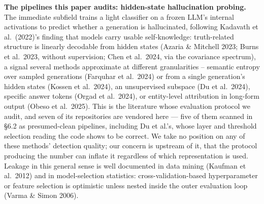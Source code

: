 \documentclass[10pt]{article} %
\begin{document}
\textbf{The pipelines this paper audits: hidden-state hallucination probing.}
The immediate subfield trains a light classifier on a frozen LLM's internal
activations to predict whether a generation is hallucinated, following
Kadavath et al.\ (2022)'s finding that models carry usable self-knowledge:
truth-related structure is linearly decodable from hidden states (Azaria \&
Mitchell 2023; Burns et al.\ 2023, without supervision; Chen et al.\ 2024,
via the covariance spectrum), a signal several methods approximate at
different granularities -- semantic entropy over sampled generations
(Farquhar et al.\ 2024) or from a single generation's hidden states (Kossen
et al.\ 2024), an unsupervised subspace (Du et al.\ 2024), specific answer
tokens (Orgad et al.\ 2024), or entity-level attribution in long-form output
(Obeso et al.\ 2025). This is the literature whose evaluation protocol we
audit, and seven of its
repositories are vendored here --- five of them scanned in §6.2 as
presumed-clean pipelines, including Du et al.'s, whose layer and threshold
selection reading the code shows to be correct. We take no position on any of
these methods' detection quality; our concern is upstream of it, that the
protocol producing the number can inflate it regardless of which representation
is used. Leakage in this general sense is well documented in data mining
(Kaufman et al.\ 2012) and in model-selection statistics: cross-validation-based
hyperparameter or feature selection is optimistic unless nested inside the
outer evaluation loop (Varma \& Simon 2006).
\end{document}

